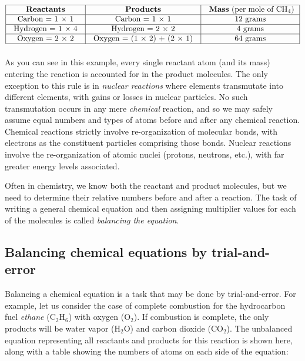 
$$\vbox{\offinterlineskip
\halign{\strut
\vrule \quad\hfil # \ \hfil & 
\vrule \quad\hfil # \ \hfil & 
\vrule \quad\hfil # \ \hfil \vrule \cr
\noalign{\hrule}
%
\textbf{Reactants} & \textbf{Products} & \textbf{Mass} (per mole of CH$_{4}$)\cr
%
\noalign{\hrule}
%
Carbon = 1 $\times$ 1 & Carbon = 1 $\times$ 1 & 12 grams \cr
%
\noalign{\hrule}
%
Hydrogen = 1 $\times$ 4 & Hydrogen = 2 $\times$ 2 & 4 grams \cr
%
\noalign{\hrule}
%
Oxygen = 2 $\times$ 2 & Oxygen = (1 $\times$ 2) + (2 $\times$ 1) & 64 grams \cr
%
\noalign{\hrule}
} %
}$$ %

As you can see in this example, every single reactant atom (and its mass) entering the reaction is accounted for in the product molecules.  The only exception to this rule is in \textit{nuclear reactions} where elements transmutate into different elements, with gains or losses in nuclear particles.  No such transmutation occurs in any mere \textit{chemical} reaction, and so we may safely assume equal numbers and types of atoms before and after any chemical reaction.  Chemical reactions strictly involve re-organization of molecular bonds, with electrons as the constituent particles comprising those bonds.  Nuclear reactions involve the re-organization of atomic nuclei (protons, neutrons, etc.), with far greater energy levels associated.   

Often in chemistry, we know both the reactant and product molecules, but we need to determine their relative numbers before and after a reaction.  The task of writing a general chemical equation and then assigning multiplier values for each of the molecules is called \textit{balancing the equation}.  







\filbreak
\subsection{Balancing chemical equations by trial-and-error}

Balancing a chemical equation is a task that may be done by trial-and-error.  For example, let us consider the case of complete combustion for the hydrocarbon fuel \textit{ethane} (C$_{2}$H$_{6}$) with oxygen (O$_{2}$).  If combustion is complete, the only products will be water vapor (H$_{2}$O) and carbon dioxide (CO$_{2}$).  The unbalanced equation representing all reactants and products for this reaction is shown here, along with a table showing the numbers of atoms on each side of the equation:

